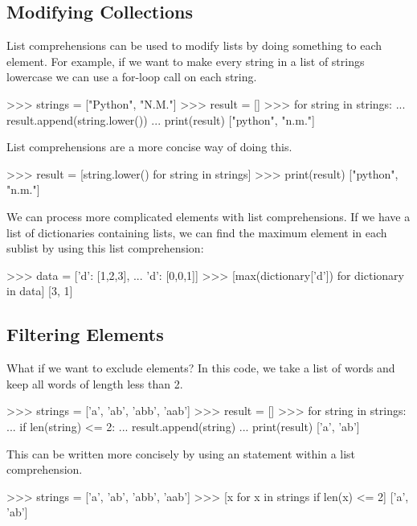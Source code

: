 \documentclass[11pt]{cselabheader}
\begin{document}
\subsection{Modifying Collections}

List comprehensions can be used to modify lists by doing something to
each element.  For example, if we want to make every string in a list
of strings lowercase we can use a for-loop call 
on each string.

\begin{pyconcode}
>>> strings = ["Python", "N.M."]
>>> result = []
>>> for string in strings:
...    result.append(string.lower())
... print(result)
["python", "n.m."]
\end{pyconcode}

List comprehensions are a more concise way of doing this.

\begin{pyconcode}
>>> result = [string.lower() for string in strings]
>>> print(result)
["python", "n.m."]
\end{pyconcode}

We can process more complicated elements with list comprehensions.
If we have a list of dictionaries containing lists, we can find the maximum
element in each sublist by using this list comprehension:

\begin{pyconcode}
>>> data = [{'d': [1,2,3]},
...         {'d': [0,0,1]}]
>>> [max(dictionary['d']) for dictionary in data]
[3, 1]
\end{pyconcode}

\subsection{Filtering Elements}

What if we want to exclude elements? In this code, we take a list of words
and keep all words of length less than 2.

\begin{pyconcode}
>>> strings = ['a', 'ab', 'abb', 'aab']
>>> result = []
>>> for string in strings:
...    if len(string) <= 2:
...        result.append(string)
... print(result)
['a', 'ab']
\end{pyconcode}

This can be written more concisely by using an 
statement within a list comprehension.

\begin{pyconcode}
>>> strings = ['a', 'ab', 'abb', 'aab']
>>> [x for x in strings if len(x) <= 2]
['a', 'ab']
\end{pyconcode}
\end{document}
